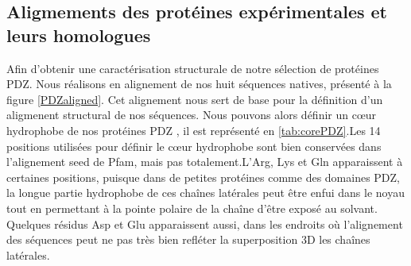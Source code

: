 \subsection{Aligmements des protéines expérimentales et leurs homologues}



Afin d'obtenir une caractérisation structurale de notre sélection de protéines PDZ. Nous réalisons en alignement de nos huit séquences natives, présenté à la figure \ref{PDZaligned}. Cet alignement nous sert de base pour la définition d'un aligmenent structural de nos séquences. Nous pouvons alors définir un cœur hydrophobe de  nos protéines \og PDZ \fg , il est représenté en \ref{tab:corePDZ}.Les 14 positions utilisées pour définir le cœur hydrophobe sont bien conservées dans l'alignement \og seed \fg de Pfam, mais pas totalement.L'Arg, Lys et Gln apparaissent à certaines positions, puisque dans de petites protéines comme des domaines PDZ, la longue partie hydrophobe  de ces chaînes latérales peut être enfui dans le noyau tout en permettant à la pointe polaire de la chaîne d'être exposé au solvant. Quelques résidus  Asp et Glu apparaissent aussi, dans les endroits où l'alignement des séquences peut ne pas très bien refléter la superposition 3D les chaînes latérales.

    

